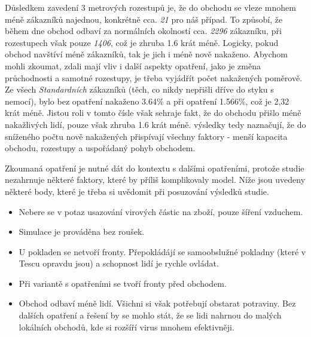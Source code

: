 \documentclass[11pt,a4paper]{article}
\begin{document}
Důsledkem zavedení 3 metrových rozestupů je, že do obchodu se vleze mnohem méně zákazníků najednou, konkrétně cca. \emph{21} pro náš případ. 
To způsobí, že během dne obchod odbaví za normálních okolností cca. \emph{2296} zákazníku, při rozestupech však pouze \emph{1406}, což je zhruba 1.6 krát méně. Logicky, pokud obchod navštíví méně zákazníků, tak je jich i méně nově nakaženo. Abychom mohli zkoumat, zdali mají vliv i další aspekty opatření, jako je změna průchodnosti a samotné rozestupy, je třeba vyjádřít počet nakažených poměrově. Ze všech \emph{Standardních} zákazníků (těch, co nikdy nepřišli dříve do styku s nemocí), bylo bez opatření nakaženo 3.64\% a při opatření 1.566\%, což je 2,32 krát méně. Jistou roli v tomto čísle však sehraje fakt, že do obchodu přišlo méně nakažlivých lidí, pouze však zhruba 1.6 krát méně. výsledky tedy naznačují, že do sníženého počtu nově nakažených přispívají všechny faktory - menší kapacita obchodu, rozestupy a uspořádaný pohyb obchodem. 

Zkoumaná opatření je nutné dát do kontextu s dalšími opatřeními, protože studie nezahrnuje některé faktory, které by příliš komplikovaly model. Níže jsou uvedeny některé body, které je třeba si uvědomit při posuzování výsledků studie.
\begin{itemize}
    \item Nebere se v potaz usazování virových částic na zboží, pouze šíření vzduchem. 
    \item Simulace je prováděna bez roušek.
    \item U pokladen se netvoří fronty. Přepokládájí se samoobslužné pokladny (které v Tescu opravdu jsou) a schopnost lidí je rychle ovládat.
    \item Při variantě s opatřeními se tvoří fronty před obchodem. 
    \item Obchod odbaví méně lidí. Všichni si však potřebují obstarat potraviny. Bez dalších opatření a řešení by se mohlo stát, že se lidi        nahrnou do malých lokálních obchodů, kde si rozšíří virus mnohem efektivněji.
\end{itemize}

\newpage
\nocite{*}
\printbibliography[heading=bibintoc]
\end{document}
